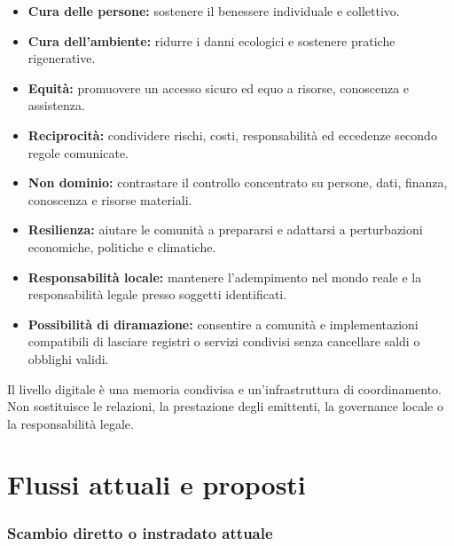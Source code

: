 \documentclass[11pt]{article}
\begin{document}
\begin{itemize}[leftmargin=*]
\item \textbf{Cura delle persone:} sostenere il benessere individuale e collettivo.
\item \textbf{Cura dell'ambiente:} ridurre i danni ecologici e sostenere pratiche rigenerative.
\item \textbf{Equità:} promuovere un accesso sicuro ed equo a risorse, conoscenza e assistenza.
\item \textbf{Reciprocità:} condividere rischi, costi, responsabilità ed eccedenze secondo regole comunicate.
\item \textbf{Non dominio:} contrastare il controllo concentrato su persone, dati, finanza, conoscenza e risorse materiali.
\item \textbf{Resilienza:} aiutare le comunità a prepararsi e adattarsi a perturbazioni economiche, politiche e climatiche.
\item \textbf{Responsabilità locale:} mantenere l'adempimento nel mondo reale e la responsabilità legale presso soggetti identificati.
\item \textbf{Possibilità di diramazione:} consentire a comunità e implementazioni compatibili di lasciare registri o servizi condivisi senza cancellare saldi o obblighi validi.
\end{itemize}
Il livello digitale è una memoria condivisa e un'infrastruttura di coordinamento. Non sostituisce le relazioni, la prestazione degli emittenti, la governance locale o la responsabilità legale.

\section*{Flussi attuali e proposti}

\subsubsection*{Scambio diretto o instradato attuale}
\end{document}
